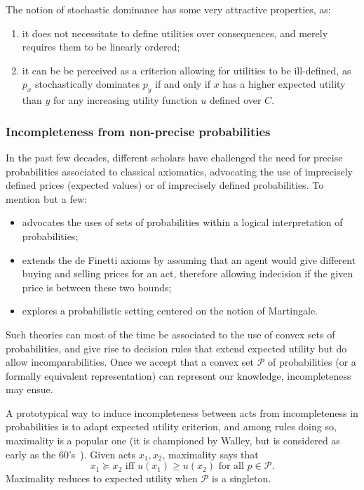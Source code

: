 \documentclass[french, english]{llncs}
\begin{document}
The notion of stochastic dominance has some very attractive properties, as:
\begin{enumerate}
	\item it does not necessitate to define utilities over consequences, and merely requires them to be linearly ordered;
	\item it can be be perceived as a criterion allowing for utilities to be ill-defined, as $p_x$ stochastically dominates $p_y$ if and only if $x$ has a higher expected utility than $y$ for any increasing utility function $u$ defined over $C$. 
\end{enumerate}

\subsubsection{Incompleteness from non-precise probabilities}

In the past few decades, different scholars have challenged the need for precise probabilities associated to classical axiomatics, advocating the use of imprecisely defined prices (expected values) or of imprecisely defined probabilities. To mention but a few:
\begin{itemize} 
	\item \citet{levi_enterprise_1983} advocates the uses of sets of probabilities within a logical interpretation of probabilities;
	\item \citet{walley_statistical_1991} extends the de Finetti axioms by assuming that an agent would give different buying and selling prices for an act, therefore allowing indecision if the given price is between these two bounds;
	\item \citet{shafer_probability_2005} explores a probabilistic setting centered on the notion of Martingale.
\end{itemize}
Such theories can most of the time be associated to the use of convex sets of probabilities, and give rise to decision rules that extend expected utility but do allow incomparabilities. Once we accept that a convex set $\mathcal{P}$ of probabilities (or a formally equivalent representation) can represent our knowledge, incompleteness may ensue. 

A prototypical way to induce incompleteness between acts from incompleteness in probabilities is to adapt expected utility criterion, and among rules doing so, maximality is a popular one (it is championed by Walley, but is considered as early as the 60's~\citep{aumann_utility_1962}). Given acts $x_1, x_2$, maximality says that 
$$x_1 \succeq x_2 \text{ iff }  u(x_1) ≥ u(x_2) \text{ for all } p \in \mathcal{P}.$$
Maximality reduces to expected utility when $\mathcal{P}$ is a singleton. 
\end{document}
